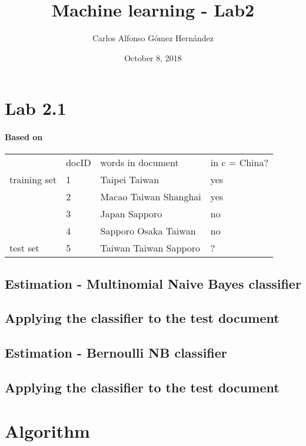\documentclass{article}
\title{Machine learning - Lab2}
\author{Carlos Alfonso Gómez Hernández}
\date{October 8, 2018}
\begin{document}
\maketitle

\section{Lab 2.1}

\paragraph{Based on }
\begin{table}[]
\begin{tabular}{@{}llll@{}}
             & docID & words in document     & in c = China? \\
training set & 1     & Taipei Taiwan         & yes           \\
             & 2     & Macao Taiwan Shanghai & yes           \\
             & 3     & Japan Sapporo         & no            \\
             & 4     & Sapporo Osaka Taiwan  & no            \\
test set     & 5     & Taiwan Taiwan Sapporo & ?             \\
\end{tabular}
\end{table}

\subsection{Estimation - Multinomial Naive Bayes classifier}


\subsection{Applying the classifier to the test document}

\subsection{Estimation - Bernoulli NB classifier}

\subsection{Applying the classifier to the test document}

\section{Algorithm}
\end{document}
